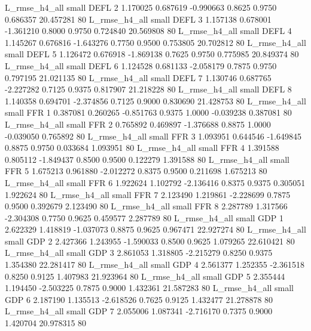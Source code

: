  L_rmse_h4_all      small     DEFL                 2 1.170025 0.687619 -0.990663 0.8625 0.9750  0.686357   20.457281 80
 L_rmse_h4_all      small     DEFL                 3 1.157138 0.678001 -1.361210 0.8000 0.9750  0.724840   20.569808 80
 L_rmse_h4_all      small     DEFL                 4 1.145267 0.676816 -1.643276 0.7750 0.9500  0.753805   20.702812 80
 L_rmse_h4_all      small     DEFL                 5 1.126472 0.676918 -1.869138 0.7625 0.9750  0.775985   20.849374 80
 L_rmse_h4_all      small     DEFL                 6 1.124528 0.681133 -2.058179 0.7875 0.9750  0.797195   21.021135 80
 L_rmse_h4_all      small     DEFL                 7 1.130746 0.687765 -2.227282 0.7125 0.9375  0.817907   21.218228 80
 L_rmse_h4_all      small     DEFL                 8 1.140358 0.694701 -2.374856 0.7125 0.9000  0.830690   21.428753 80
 L_rmse_h4_all      small      FFR                 1 0.387081 0.260265 -0.851763 0.9375 1.0000 -0.039238    0.387081 80
 L_rmse_h4_all      small      FFR                 2 0.765892 0.469897 -1.376688 0.8875 1.0000 -0.039050    0.765892 80
 L_rmse_h4_all      small      FFR                 3 1.093951 0.644546 -1.649845 0.8875 0.9750  0.033684    1.093951 80
 L_rmse_h4_all      small      FFR                 4 1.391588 0.805112 -1.849437 0.8500 0.9500  0.122279    1.391588 80
 L_rmse_h4_all      small      FFR                 5 1.675213 0.961880 -2.012272 0.8375 0.9500  0.211698    1.675213 80
 L_rmse_h4_all      small      FFR                 6 1.922624 1.102792 -2.136416 0.8375 0.9375  0.305051    1.922624 80
 L_rmse_h4_all      small      FFR                 7 2.123490 1.219861 -2.228699 0.7875 0.9500  0.392679    2.123490 80
 L_rmse_h4_all      small      FFR                 8 2.287789 1.317566 -2.304308 0.7750 0.9625  0.459577    2.287789 80
 L_rmse_h4_all      small      GDP                 1 2.622329 1.418819 -1.037073 0.8875 0.9625  0.967471   22.927274 80
 L_rmse_h4_all      small      GDP                 2 2.427366 1.243955 -1.590033 0.8500 0.9625  1.079265   22.610421 80
 L_rmse_h4_all      small      GDP                 3 2.861053 1.318805 -2.215279 0.8250 0.9375  1.354380   22.281417 80
 L_rmse_h4_all      small      GDP                 4 2.561377 1.252355 -2.361518 0.8250 0.9125  1.407983   21.923964 80
 L_rmse_h4_all      small      GDP                 5 2.355444 1.194450 -2.503225 0.7875 0.9000  1.432361   21.587283 80
 L_rmse_h4_all      small      GDP                 6 2.187190 1.135513 -2.618526 0.7625 0.9125  1.432477   21.278878 80
 L_rmse_h4_all      small      GDP                 7 2.055006 1.087341 -2.716170 0.7375 0.9000  1.420704   20.978315 80
